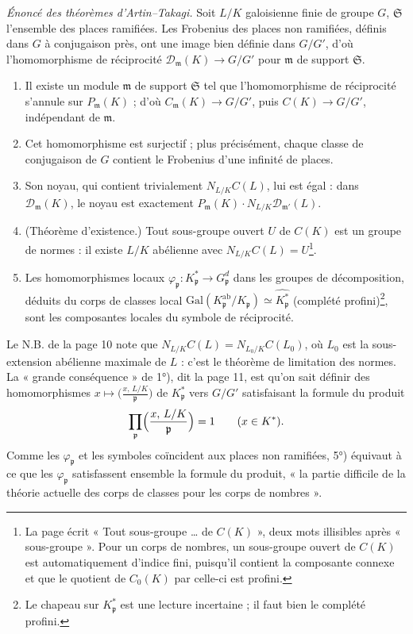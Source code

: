 \documentclass[11pt,a4paper]{article}
\begin{document}
\emph{Énoncé des théorèmes d'Artin–Takagi.} Soit $L/K$ galoisienne finie de groupe
$G$, $\mathfrak{S}$ l'ensemble des places ramifiées. Les Frobenius des places non
ramifiées, définis dans $G$ à conjugaison près, ont une image bien définie dans
$G/G'$, d'où l'homomorphisme de réciprocité $\mathcal{D}_{\mathfrak{m}}(K) \to
G/G'$ pour $\mathfrak{m}$ de support $\mathfrak{S}$.
\begin{enumerate}
\item[1°)] Il existe un module $\mathfrak{m}$ de support $\mathfrak{S}$ tel que
l'homomorphisme de réciprocité s'annule sur $P_{\mathfrak{m}}(K)$ ; d'où
$C_{\mathfrak{m}}(K) \to G/G'$, puis $C(K) \to G/G'$, indépendant de
$\mathfrak{m}$.
\item[2°)] Cet homomorphisme est surjectif ; plus précisément, chaque classe de
conjugaison de $G$ contient le Frobenius d'une infinité de places.
\item[3°)] Son noyau, qui contient trivialement $N_{L/K}C(L)$, lui est égal :
dans $\mathcal{D}_{\mathfrak{m}}(K)$, le noyau est exactement
$P_{\mathfrak{m}}(K) \cdot N_{L/K}\mathcal{D}_{\mathfrak{m}'}(L)$.
\item[4°)] (Théorème d'existence.) Tout sous-groupe ouvert $U$ de $C(K)$ est un
groupe de normes : il existe $L/K$ abélienne avec $N_{L/K}C(L) = U$\footnote{La
page écrit « Tout sous-groupe … de $C(K)$ », deux mots illisibles après
« sous-groupe ». Pour un corps de nombres, un sous-groupe ouvert de $C(K)$ est
automatiquement d'indice fini, puisqu'il contient la composante connexe et que
le quotient de $C_0(K)$ par celle-ci est profini.}.
\item[5°)] Les homomorphismes locaux $\varphi_{\mathfrak{p}} : K^{*}_{\mathfrak{p}}
\to G^{d}_{\mathfrak{p}}$ dans les groupes de décomposition, déduits du corps de
classes local $\mathrm{Gal}(K^{\mathrm{ab}}_{\mathfrak{p}}/K_{\mathfrak{p}})
\simeq \widehat{K^{*}_{\mathfrak{p}}}$ (complété profini)\footnote{Le chapeau sur
$K^{*}_{\mathfrak{p}}$ est une lecture incertaine ; il faut bien le complété
profini.}, sont les composantes locales du symbole de réciprocité.
\end{enumerate}
Le N.B. de la page 10 note que $N_{L/K}C(L) = N_{L_0/K}C(L_0)$, où $L_0$ est la
sous-extension abélienne maximale de $L$ : c'est le théorème de limitation des
normes. La « grande conséquence » de 1°), dit la page 11, est qu'on sait
définir des homomorphismes $x \mapsto \bigl(\frac{x,\,L/K}{\mathfrak{p}}\bigr)$
de $K^{*}_{\mathfrak{p}}$ vers $G/G'$ satisfaisant la formule du produit
\[
\prod_{\mathfrak{p}} \Bigl(\frac{x,\,L/K}{\mathfrak{p}}\Bigr) = 1 \qquad (x \in K^{*}).
\]
Comme les $\varphi_{\mathfrak{p}}$ et les symboles coïncident aux places non
ramifiées, 5°) équivaut à ce que les $\varphi_{\mathfrak{p}}$ satisfassent
ensemble la formule du produit, « la partie difficile de la théorie actuelle des
corps de classes pour les corps de nombres ».
\end{document}
